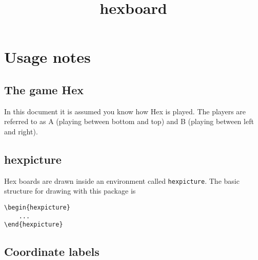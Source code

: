 \documentclass[a4paper,12pt]{article}
\title{hexboard}
\author{}
\date{}
\begin{document}
   
    
    \maketitle 
    
    \begin{center}
        \begin{hexgame}[4]
        \end{hexgame}
    \end{center}
    
    \section{Usage notes}
    
    \subsection{The game Hex}
    
    In this document it is assumed you know how Hex is played. The players are referred to as A (playing between bottom and top) and B (playing between left and right).
    
    \subsection{hexpicture}
    
    Hex boards are drawn inside an environment called \verb|hexpicture|. The basic structure for drawing with this package is 
    
    \begin{verbatim}\begin{hexpicture}
    ...
\end{hexpicture}\end{verbatim}
    
    \subsection{Coordinate labels}
    
\end{document}
